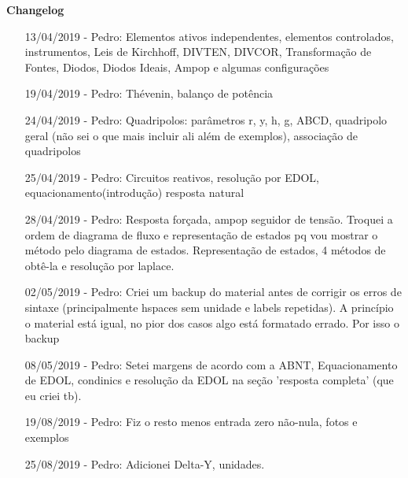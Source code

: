 \documentclass{article}
\numberwithin{equation}{section}
\begin{document}
    \newpage
    \begin{center}{\textbf{\Large Changelog}}\end{center}
    \begin{itemize}
        \item[13/04/2019  - Pedro:] Elementos ativos independentes, elementos controlados, instrumentos, Leis de Kirchhoff, DIVTEN, DIVCOR, Transformação de Fontes, Diodos, Diodos Ideais, Ampop e algumas configurações
        \item[19/04/2019 - Pedro:] Thévenin, balanço de potência
        \item[24/04/2019 - Pedro:] Quadripolos: parâmetros r, y, h, g, ABCD, quadripolo geral (não sei o que mais incluir ali além de exemplos), associação de quadripolos
        \item[25/04/2019 - Pedro:] Circuitos reativos, resolução por EDOL, equacionamento(introdução) resposta natural
        \item[28/04/2019 - Pedro:] Resposta forçada, ampop seguidor de tensão. Troquei a ordem de diagrama de fluxo e representação de estados pq vou mostrar o método pelo diagrama de estados. Representação de estados, 4 métodos de obtê-la e resolução por laplace.
        \item[02/05/2019 - Pedro:] Criei um backup do material antes de corrigir os erros de sintaxe (principalmente hspaces sem unidade e labels repetidas). A princípio o material está igual, no pior dos casos algo está formatado errado. Por isso o backup
        \item[08/05/2019 - Pedro:] Setei margens de acordo com a ABNT, Equacionamento de EDOL, condinics e resolução da EDOL na seção 'resposta completa' (que eu criei tb).
        \item[19/08/2019 - Pedro:] Fiz o resto menos entrada zero não-nula, fotos e exemplos
        \item[25/08/2019 - Pedro:] Adicionei Delta-Y, unidades.
    \end{itemize}
\end{document}
